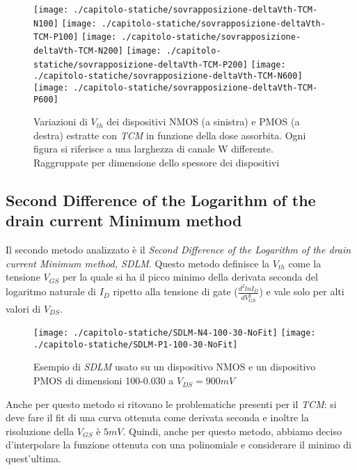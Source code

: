
\begin{figure}[H]
  \centering
  \texttt{[image: ./capitolo-statiche/sovrapposizione-deltaVth-TCM-N100]}
  \texttt{[image: ./capitolo-statiche/sovrapposizione-deltaVth-TCM-P100]}
  \texttt{[image: ./capitolo-statiche/sovrapposizione-deltaVth-TCM-N200]}
  \texttt{[image: ./capitolo-statiche/sovrapposizione-deltaVth-TCM-P200]}
  \texttt{[image: ./capitolo-statiche/sovrapposizione-deltaVth-TCM-N600]}
  \texttt{[image: ./capitolo-statiche/sovrapposizione-deltaVth-TCM-P600]}

  \caption{Variazioni di $V_{th}$ dei dispositivi NMOS (a sinistra) e PMOS (a destra) estratte con \emph{TCM} in funzione della dose assorbita. Ogni figura si riferisce a una larghezza di canale W differente. Raggruppate per dimensione dello spessore dei dispositivi}
  \label{fig:deltaVthTCM}
\end{figure}

\subsection[SDLM]{Second Difference of the Logarithm of the drain current Minimum method}
Il secondo metodo analizzato è il \emph{Second Difference of the Logarithm of the drain current Minimum method, SDLM}. Questo metodo definisce la $V_{th}$ come la tensione $V_{GS}$ per la quale si ha il picco minimo della derivata seconda del logaritmo naturale di $I_D$ ripetto alla tensione di gate ($\frac{d^2lnI_D}{dV_{GS}^2}$) e vale solo per alti valori di $V_{DS}$\cite{art1}.


\begin{figure}[H]
  \centering
  \texttt{[image: ./capitolo-statiche/SDLM-N4-100-30-NoFit]}
  \texttt{[image: ./capitolo-statiche/SDLM-P1-100-30-NoFit]}
  \caption{Esempio di \emph{SDLM} usato su un dispositivo NMOS e un dispositivo PMOS di dimensioni 100-0.030 a $V_{DS} = 900 mV$}
\end{figure}

Anche per questo metodo si ritovano le problematiche presenti per il \emph{TCM}: si deve fare il fit di una curva ottenuta come derivata seconda e inoltre la risoluzione della $V_{GS}$ è $5mV$.
Quindi, anche per questo metodo, abbiamo deciso d'interpolare la funzione ottenuta con una polinomiale e considerare il minimo di quest'ultima.

